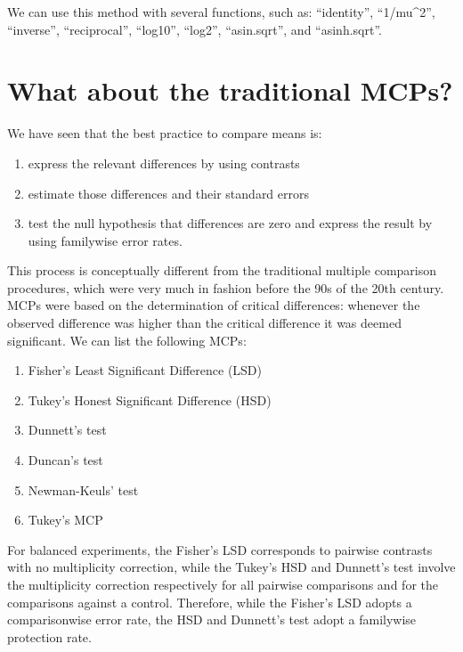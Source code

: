 \documentclass[a4paper,12pt,oneside]{book}
\providecommand{\tightlist}{%
  \setlength{\itemsep}{0pt}\setlength{\parskip}{0pt}}
\begin{document}
We can use this method with several functions, such as: ``identity'', ``1/mu\^{}2'', ``inverse'', ``reciprocal'', ``log10'', ``log2'', ``asin.sqrt'', and ``asinh.sqrt''.

\hypertarget{what-about-the-traditional-mcps}{%
\section{What about the traditional MCPs?}\label{what-about-the-traditional-mcps}}

We have seen that the best practice to compare means is:

\begin{enumerate}
\def\labelenumi{\arabic{enumi}.}
\tightlist
\item
  express the relevant differences by using contrasts
\item
  estimate those differences and their standard errors
\item
  test the null hypothesis that differences are zero and express the result by using familywise error rates.
\end{enumerate}

This process is conceptually different from the traditional multiple comparison procedures, which were very much in fashion before the 90s of the 20th century. MCPs were based on the determination of critical differences: whenever the observed difference was higher than the critical difference it was deemed significant. We can list the following MCPs:

\begin{enumerate}
\def\labelenumi{\arabic{enumi}.}
\tightlist
\item
  Fisher's Least Significant Difference (LSD)
\item
  Tukey's Honest Significant Difference (HSD)
\item
  Dunnett's test
\item
  Duncan's test
\item
  Newman-Keuls' test
\item
  Tukey's MCP
\end{enumerate}

For balanced experiments, the Fisher's LSD corresponds to pairwise contrasts with no multiplicity correction, while the Tukey's HSD and Dunnett's test involve the multiplicity correction respectively for all pairwise comparisons and for the comparisons against a control. Therefore, while the Fisher's LSD adopts a comparisonwise error rate, the HSD and Dunnett's test adopt a familywise protection rate.
\end{document}
